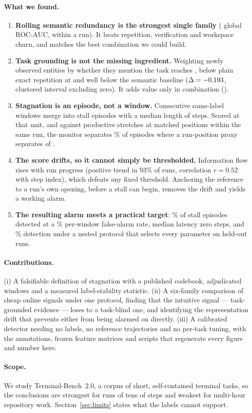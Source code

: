 \paragraph{What we found.}
\begin{enumerate}[leftmargin=1.4em,itemsep=2pt,topsep=3pt]
\item \textbf{Rolling semantic redundancy is the strongest single family} (\paucBFoursemantic{} global
ROC-AUC, \pwithinBFoursemantic{} within a run). It beats repetition, verification and workspace churn, and
matches the best combination we could build.
\item \textbf{Task grounding is not the missing ingredient.} Weighting newly observed entities by whether
they mention the task reaches \paucCOneevidence{}, below plain exact repetition at \paucBTworepThree{} and
well below the semantic baseline ($\Delta=-0.193{}$, clustered interval excluding
zero). It adds value only in combination (\paucCThreeevidSem{}).
\item \textbf{Stagnation is an episode, not a window.} Consecutive same-label windows merge into
\pregEpisodes{} stall episodes with a median length of \pregMedianSteps{} steps. Scored at that unit, and
against productive stretches at matched positions within the same run, the monitor separates
\pregPmPct{}\% of episodes where a run-position proxy separates \pregProxySep{} of \pregProxyTot{}.
\item \textbf{The score drifts, so it cannot simply be thresholded.} Information flow rises with run
progress (positive trend in 93\% of runs, correlation $r=0.52$ with step index), which defeats any fixed
threshold. Anchoring the reference to a run's own opening, before a stall can begin, removes the drift and
yields a working alarm.
\item \textbf{The resulting alarm meets a practical target}: \palDet{}\% of stall episodes detected at a
\palFaWin{}\% per-window false-alarm rate, median latency zero steps, and \pnestedDet{}\% detection under a
nested protocol that selects every parameter on held-out runs.
\end{enumerate}

\paragraph{Contributions.}
(i) A falsifiable definition of stagnation with a published codebook, \pannWindowsTotal{} adjudicated
windows and a measured label-stability statistic. (ii) A six-family comparison of cheap online signals
under one protocol, finding that the intuitive signal --- task-grounded evidence --- loses to a task-blind
one, and identifying the representation drift that prevents either from being alarmed on directly. (iii) A
calibrated detector needing no labels, no reference trajectories and no per-task tuning, with the
annotations, frozen feature matrices and scripts that regenerate every figure and number here.

\paragraph{Scope.}
We study Terminal-Bench~2.0, a corpus of short, self-contained terminal tasks, so the conclusions are
strongest for runs of tens of steps and weakest for multi-hour repository work.
Section~\ref{sec:limits} states what the labels cannot support.
